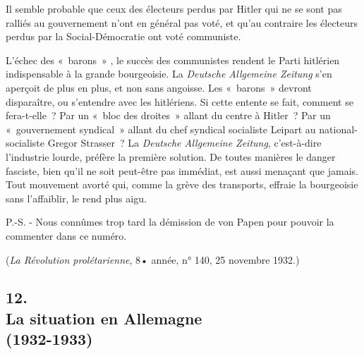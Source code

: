 \documentclass[french,twoside]{book} %
\begin{document}
Il semble probable que ceux des électeurs perdus par Hitler qui ne se sont pas ralliés au gouvernement n'ont en général pas voté, et qu'au contraire les électeurs perdus par la Social-Démocratie ont voté communiste.\par
L'échec des « barons » , le succès des communistes rendent le Parti hitlé­rien indispensable à la grande bourgeoisie. La {\itshape Deutsche Allgemeine Zeitung} s'en aperçoit de plus en plus, et non sans angoisse. Les « barons » devront disparaître, ou s'entendre avec les hitlériens. Si cette entente se fait, comment se fera-t-elle ? Par un « bloc des droites » allant du centre à Hitler ? Par un « gouvernement syndical » allant du chef syndical socialiste Leipart au national-socialiste Gregor Strasser ? La {\itshape Deutsche Allgemeine Zeitung}, c'est-à-dire l'industrie lourde, préfère la première solution. De toutes manières le danger fasciste, bien qu'il ne soit peut-être pas immédiat, est aussi menaçant que jamais. Tout mouvement avorté qui, comme la grève des transports, effraie la bourgeoisie sans l'affaiblir, le rend plus aigu.\par
P.-S. - Nous connûmes trop tard la démission de von Papen pour pouvoir la commenter dans ce numéro.\par
\par
({\itshape La Révolution prolétarienne}, 8• année, n° 140, 25 novembre 1932.)\par

\subsection[{12. La situation en Allemagne  (1932-1933)}]{12. \\
La situation en Allemagne \protect\footnotemark  \\
(1932-1933)}
\noindent \par
\end{document}
